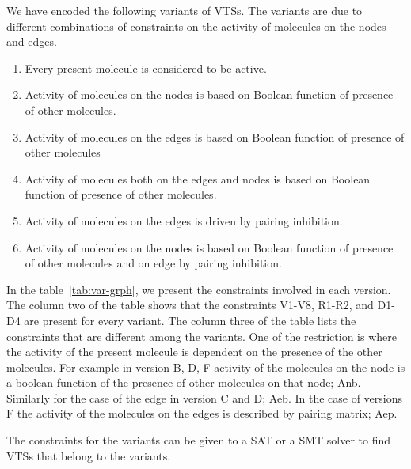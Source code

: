 We have encoded the following variants of VTSs.
%
The variants are due to different combinations of constraints on the
activity of molecules on the nodes and edges.
%
\begin{enumerate}
\item Every present molecule is considered to be active.
\item Activity of molecules on the nodes is based on Boolean function of presence of other molecules. 
\item Activity of molecules on the edges is based on Boolean function of presence of other molecules
\item Activity of molecules both on the edges and nodes is based on Boolean function of presence of other molecules.
\item Activity of molecules on the edges is driven by pairing inhibition.
\item Activity of molecules on the nodes is based on Boolean function of presence of other molecules and on edge by pairing inhibition.
\end{enumerate}
%
%

In the table~\ref{tab:var-grph}, we present the constraints involved in each version.
%
The column two of the table shows that the constraints V1-V8, R1-R2, and D1-D4 are present
for every variant.
%
The column three of the table lists the constraints that are different among the variants.
%
%
One of the restriction is where the activity of the present molecule is dependent on the presence of the other molecules.
%
For example in version B, D, F activity of the molecules on the node is a boolean function of the presence of other molecules on that node; Anb.
%
Similarly for the case of the edge in version C and D; Aeb.
%
In the case of versions F the activity of the molecules on the edges
is described by pairing matrix; Aep.

%
The constraints for the variants can be given to a SAT or a SMT solver to find
VTSs that belong to the variants.

